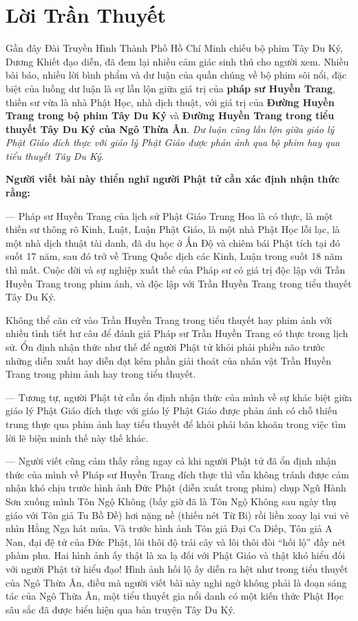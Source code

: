 \chapter{Lời Trần Thuyết} %
\label{cha:loi_tran_thuyet}

Gần đây Đài Truyền Hình Thành Phố Hồ Chí Minh chiếu bộ phim Tây Du Ký, Dương Khiết đạo diễn, đã đem lại nhiều cảm giác sinh thú cho người xem. Nhiều bài báo, nhiều lời bình phẩm và dư luận của quần chúng về bộ phim sôi nổi, đặc biệt của luồng dư luận là sự lẫn lộn giữa giá trị của {\bf pháp sư Huyền Trang}, thiền sư vừa là nhà Phật Học, nhà dịch thuật, với giá trị của {\bf Đường Huyền Trang trong bộ phim Tây Du Ký} và {\bf Đường Huyền Trang trong tiểu thuyết Tây Du Ký của Ngô Thừa Ân}. \emph{Dư luận cũng lẫn lộn giữa giáo lý Phật Giáo đích thực với giáo lý Phật Giáo được phản ảnh qua bộ phim hay qua tiểu thuyết Tây Du Ký}.

{\bf Người viết bài này thiển nghĩ người Phật tử cần xác định nhận thức rằng:}

— Pháp sư Huyền Trang của lịch sử Phật Giáo Trung Hoa là có thực, là một thiền sư thông rõ Kinh, Luật, Luận Phật Giáo, là một nhà Phật Học lỗi lạc, là một nhà dịch thuật tài danh, đã du học ở Ấn Độ và chiêm bái Phật tích tại đó suốt 17 năm, sau đó trở về Trung Quốc dịch các Kinh, Luận trong suốt 18 năm thì mất. Cuộc đời và sự nghiệp xuất thế của Pháp sư có giá trị độc lập với Trần Huyền Trang trong phim ảnh, và độc lập với Trần Huyền Trang trong tiểu thuyết Tây Du Ký.

Không thể căn cứ vào Trần Huyền Trang trong tiểu thuyết hay phim ảnh với nhiều tình tiết hư câu để đánh giá Pháp sư Trần Huyền Trang có thực trong lịch sử. Ổn định nhận thức như thế để người Phật tử khỏi phải phiền não trước những diễn xuất hay diễn đạt kém phần giải thoát của nhân vật Trần Huyền Trang trong phim ảnh hay trong tiểu thuyết.

— Tương tự, người Phật tử cần ổn định nhận thức của mình về sự khác biệt giữa giáo lý Phật Giáo đích thực với giáo lý Phật Giáo được phản ánh có chỗ thiếu trung thực qua phim ảnh hay tiểu thuyết để khỏi phải băn khoăn trong việc tìm lời lẽ biện minh thế này thế khác.

— Người viết cũng cảm thấy rằng ngay cả khi người Phật tử đã ổn định nhận thức của mình về Pháp sư Huyền Trang đích thực thì vẫn không tránh được cảm nhận khó chịu trước hình ảnh Đức Phật (diễn xuất trong phim) chụp Ngũ Hành Sơn xuống mình Tôn Ngộ Không (bấy giờ đã là Tôn Ngộ Không sau ngày thụ giáo với Tôn giả Tu Bồ Đề) hơi nặng nề (thiếu nét Từ Bi) rồi liền xoay lại vui vẻ nhìn Hằng Nga hát múa. Và trước hình ảnh Tôn giả Đại Ca Diếp, Tôn giả A Nan, đại đệ tử của Đức Phật, lôi thôi độ trái cây và lôi thôi đòi ``hối lộ'' đầy nét phàm phu. Hai hình ảnh ấy thật là xa lạ đối với Phật Giáo và thật khó hiểu đối với người Phật tử hiểu đạo! Hình ảnh hối lộ ấy diễn ra hệt như trong tiểu thuyết của Ngô Thừa Ân, điều mà người viết bài này nghi ngờ không phải là đoạn sáng tác của Ngô Thừa Ân, một tiểu thuyết gia nổi danh có một kiến thức Phật Học sâu sắc đã được biểu hiện qua bản truyện Tây Du Ký.

